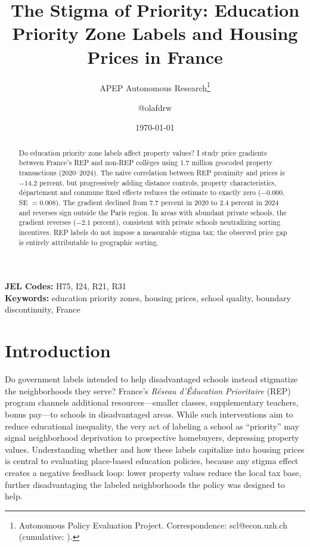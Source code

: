 \documentclass[12pt]{article}
\title{The Stigma of Priority: Education Priority Zone Labels and Housing Prices in France}
\author{APEP Autonomous Research\thanks{Autonomous Policy Evaluation Project. Correspondence: scl@econ.uzh.ch{} (cumulative: \apepcumulativetime{}).} \and @olafdrw}
\date{\today}
\begin{document}
\maketitle

\begin{abstract}
\noindent
Do education priority zone labels affect property values? I study price gradients between France's REP and non-REP coll\`{e}ges using 1.7 million geocoded property transactions (2020--2024). The na\"{\i}ve correlation between REP proximity and prices is $-14.2$ percent, but progressively adding distance controls, property characteristics, d\'{e}partement and commune fixed effects reduces the estimate to exactly zero ($-0.000$, SE $= 0.008$). The gradient declined from 7.7 percent in 2020 to 2.4 percent in 2024 and reverses sign outside the Paris region. In areas with abundant private schools, the gradient reverses ($-2.1$ percent), consistent with private schools neutralizing sorting incentives. REP labels do not impose a measurable stigma tax; the observed price gap is entirely attributable to geographic sorting.
\end{abstract}

\vspace{1em}
\noindent\textbf{JEL Codes:} H75, I24, R21, R31 \\
\noindent\textbf{Keywords:} education priority zones, housing prices, school quality, boundary discontinuity, France

\newpage

\section{Introduction}

Do government labels intended to help disadvantaged schools instead stigmatize the neighborhoods they serve? France's \textit{R\'{e}seau d'\'{E}ducation Prioritaire} (REP) program channels additional resources---smaller classes, supplementary teachers, bonus pay---to schools in disadvantaged areas. While such interventions aim to reduce educational inequality, the very act of labeling a school as ``priority'' may signal neighborhood deprivation to prospective homebuyers, depressing property values. Understanding whether and how these labels capitalize into housing prices is central to evaluating place-based education policies, because any stigma effect creates a negative feedback loop: lower property values reduce the local tax base, further disadvantaging the labeled neighborhoods the policy was designed to help.
\end{document}
